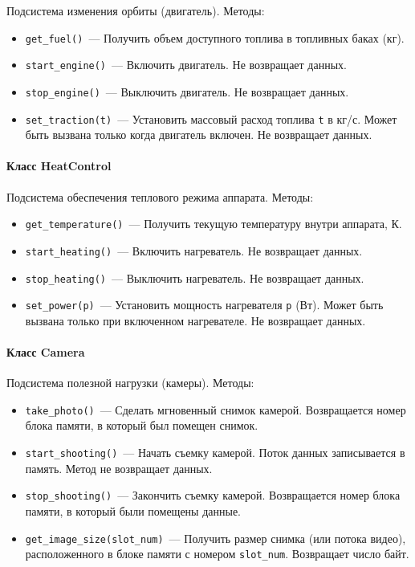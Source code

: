 \documentclass[12pt,a4paper]{article}
\begin{document}
Подсистема изменения орбиты (двигатель). Методы:

\begin{itemize}
\item \verb'get_fuel()'~--- Получить объем доступного топлива в топливных баках (кг).
\item \verb'start_engine()'~--- Включить двигатель. Не возвращает данных.
\item \verb'stop_engine()'~--- Выключить двигатель. Не возвращает данных.
\item \verb'set_traction(t)'~--- Установить массовый расход топлива \verb't' в кг/с. Может
  быть вызвана только когда двигатель включен. Не возвращает данных.
\end{itemize}

\paragraph{Класс HeatControl}

Подсистема обеспечения теплового режима аппарата. Методы:

\begin{itemize}
\item \verb'get_temperature()'~--- Получить текущую температуру внутри аппарата, К.
\item \verb'start_heating()'~--- Включить нагреватель. Не возвращает данных.
\item \verb'stop_heating()'~--- Выключить нагреватель. Не возвращает данных.
\item \verb'set_power(p)'~--- Установить мощность нагревателя \verb'p' (Вт). Может быть
  вызвана только при включенном нагревателе. Не возвращает данных.
\end{itemize}

\paragraph{Класс Camera}

Подсистема полезной нагрузки (камеры). Методы:

\begin{itemize}
\item \verb'take_photo()'~--- Сделать мгновенный снимок камерой. Возвращается номер блока
  памяти, в который был помещен снимок.
\item \verb'start_shooting()'~--- Начать съемку камерой. Поток данных записывается в
  память. Метод не возвращает данных.
\item \verb'stop_shooting()'~--- Закончить съемку камерой. Возвращается номер блока
  памяти, в который были помещены данные.
\item \verb'get_image_size(slot_num)'~--- Получить размер снимка (или потока видео),
  расположенного в блоке памяти с номером \verb'slot_num'. Возвращает число байт.
\end{itemize}
\end{document}
